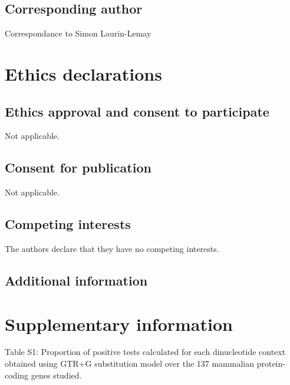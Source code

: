 \documentclass{article}
\begin{document}
\subsection*{Corresponding author}
Correspondance to Simon Laurin-Lemay
\section*{Ethics declarations}
\subsection*{Ethics approval and consent to participate}
Not applicable.
\subsection*{Consent for publication}
Not applicable.
\subsection*{Competing interests}
The authors declare that they have no competing interests.
\subsection*{Additional information}
\section*{Supplementary information}
Table S1: Proportion of positive tests calculated for each dinucleotide context obtained using GTR+G substitution model over the 137 mammalian protein-coding genes studied.
\end{document}
